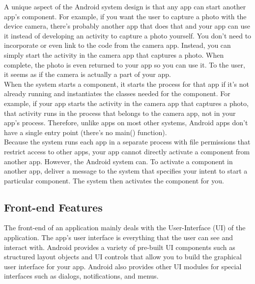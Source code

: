 \documentclass[14pt]{report}
\begin{document}
					A unique aspect of the Android system design is that any app can start another app’s component. For example, if you want the user to capture a photo with the device camera, there's probably another app that does that and your app can use it instead of developing an activity to capture a photo yourself. You don't need to incorporate or even link to the code from the camera app. Instead, you can simply start the activity in the camera app that captures a photo. When complete, the photo is even returned to your app so you can use it. To the user, it seems as if the camera is actually a part of your app.\\

					When the system starts a component, it starts the process for that app if it's not already running and instantiates the classes needed for the component. For example, if your app starts the activity in the camera app that captures a photo, that activity runs in the process that belongs to the camera app, not in your app's process. Therefore, unlike apps on most other systems, Android apps don't have a single entry point (there's no main() function).\\

					Because the system runs each app in a separate process with file permissions that restrict access to other apps, your app cannot directly activate a component from another app. However, the Android system can. To activate a component in another app, deliver a message to the system that specifies your intent to start a particular component. The system then activates the component for you.
			\subsection{Front-end Features}
					The front-end of an application mainly deals with the User-Interface (UI) of the application. The app's user interface is everything that the user can see and interact with. Android provides a variety of pre-built UI components such as structured layout objects and UI controls that allow you to build the graphical user interface for your app. Android also provides other UI modules for special interfaces such as dialogs, notifications, and menus.
\end{document}
